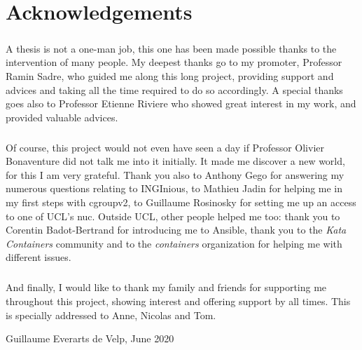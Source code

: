 \chapter*{Acknowledgements}

\paragraph{}A thesis is not a one-man job, this one has been made possible thanks to the intervention of many people.  My deepest thanks go to my promoter, Professor Ramin Sadre, who guided me along this long project, providing support and advices and taking all the time required to do so accordingly.  A special thanks goes also to Professor Etienne Riviere who showed great interest in my work, and provided valuable advices.

\paragraph{}Of course, this project would not even have seen a day if Professor Olivier Bonaventure did not talk me into it initially. It made me discover a new world, for this I am very grateful.  Thank you also to Anthony Gego for answering my numerous questions relating to INGInious, to Mathieu Jadin for helping me in my first steps with cgroupv2, to Guillaume Rosinosky for setting me up an access to one of UCL's nuc.  Outside UCL, other people helped me too: thank you to Corentin Badot-Bertrand for introducing me to Ansible, thank you to the \textit{Kata Containers} community and to the \textit{containers} organization for helping me with different issues.

\paragraph{}And finally, I would like to thank my family and friends for supporting me throughout this project, showing interest and offering support by all times.  This is specially addressed to Anne, Nicolas and Tom.

\begin{flushright}
  Guillaume Everarts de Velp, June 2020
\end{flushright}
